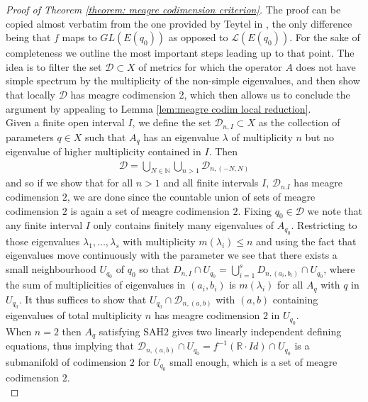 \begin{proof}[Proof of Theorem \ref{theorem: meagre codimension criterion}]
The proof can be copied almost verbatim from the one provided by Teytel in \cite[Chapter $3$]{Teytel1999}, the only difference being that $f$ maps to $GL(E(q_0))$ as opposed to $\mathcal{L}(E(q_0))$. For the sake of completeness we outline the most important steps leading up to that point. The idea is to filter the set $\mathcal{D}\subset X$ of metrics for which the operator $A$ does not have simple spectrum by the multiplicity of the non-simple eigenvalues, and then show that locally $\mathcal{D}$ has meagre codimension 2, which then allows us to conclude the argument by appealing to Lemma \ref{lem:meagre codim local reduction}.\\
Given a finite open interval $I$, we define the set $\mathcal{D}_{n,I}\subset X$ as the collection of parameters $q\in X$ such that $A_q$ has an eigenvalue $\lambda$ of multiplicity $n$ but no eigenvalue of higher multiplicity contained in $I$. Then
\begin{align*}
    \mathcal{D}=\bigcup_{N\in \mathbb{N}}\bigcup_{n>1} \mathcal{D}_{n,(-N,N)}
\end{align*}
and so if we show that for all $n>1$ and all finite intervals $I$, $\mathcal{D}_{n.I}$ has meagre codimension $2$, we are done since the countable union of sets of meagre codimension $2$ is again a set of meagre codimension $2$. Fixing $q_0\in \mathcal{D}$ we note that any finite interval $I$ only contains finitely many eigenvalues of $A_{q_0}$. Restricting to those eigenvalues $\lambda_1,\dots, \lambda_s$ with multiplicity $m(\lambda_i)\leq n$ and using the fact that eigenvalues move continuously with the parameter we see that there exists a small neighbourhood $U_{q_0}$ of $q_0$ so that $D_{n,I}\cap U_{q_0}=\bigcup_{i=1}^{s}D_{n,(a_i,b_i)}\cap U_{q_0}$, where the sum of multiplicities of eigenvalues in $(a_i,b_i)$ is $m(\lambda_i)$ for all $A_q$ with $q$ in $U_{q_0}$. It thus suffices to show that $U_{q_0}\cap\mathcal{D}_{n,(a,b)}$ with $(a,b)$ containing eigenvalues of total multiplicity $n$ has meagre codimension $2$ in $U_{q_0}$.\\
When $n=2$ then $A_q$ satisfying SAH$2$ gives two linearly independent defining equations, thus implying that $\mathcal{D}_{n,(a,b)}\cap U_{q_0} = f^{-1}(\mathbb{R}\cdot Id)\cap U_{q_0}$ is a submanifold of codimension $2$ for $U_{q_0}$ small enough, which is a set of meagre codimension $2$.\\

\end{proof}

